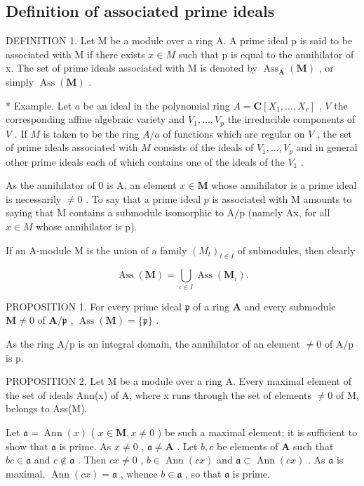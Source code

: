 \subsection{Definition of associated prime ideals}

DEFINITION 1. Let M be a module over a ring A. A prime ideal p is said to be associated with M if there exists \(x \in M\) such that p is equal to the annihilator of x. The set of prime ideals associated with M is denoted by \(\operatorname{Ass}_{\mathbf{A}}(\mathbf{M})\) , or simply \(\operatorname{Ass}(\mathbf{M})\) .

* Example. Let \(a\) be an ideal in the polynomial ring \(A = \mathbf{C}[X_1, \ldots, X_r]\) , \(V\) the corresponding affine algebraic variety and \(V_1, \ldots, V_p\) the irreducible components of \(V\) . If \(M\) is taken to be the ring \(A/a\) of functions which are regular on \(V\) , the set of prime ideals associated with \(M\) consists of the ideals of \(V_1, \ldots, V_p\) and in general other prime ideals each of which contains one of the ideals of the \(V_1\) .

As the annihilator of 0 is A, an element \(x \in \mathbf{M}\) whose annihilator is a prime ideal is necessarily \(\neq 0\) . To say that a prime ideal \(p\) is associated with M amounts to saying that M contains a submodule isomorphic to A/p (namely Ax, for all \(x \in M\) whose annihilator is p).

If an A-module M is the union of a family \((M_{t})_{t\in I}\) of submodules, then clearly

\[
\operatorname{Ass} (\mathbf {M}) = \bigcup_ {\iota \in I} \operatorname{Ass} \left(\mathbf {M} _ {\iota}\right).\tag{1}
\]

PROPOSITION 1. For every prime ideal \(\mathfrak{p}\) of a ring \(\mathbf{A}\) and every submodule \(\mathbf{M} \neq 0\) of \(\mathbf{A} / \mathfrak{p}\) , \(\operatorname{Ass}(\mathbf{M}) = \{\mathfrak{p}\}\) .

As the ring A/p is an integral domain, the annihilator of an element \(\neq0\) of A/p is p.

PROPOSITION 2. Let M be a module over a ring A. Every maximal element of the set of ideals Ann(x) of A, where x runs through the set of elements \(\neq0\) of M, belongs to Ass(M).

Let \(\mathfrak{a} = \operatorname{Ann}(x)\) ( \(x \in \mathbf{M}, x \neq 0\) ) be such a maximal element; it is sufficient to show that \(\mathfrak{a}\) is prime. As \(x \neq 0\) , \(\mathfrak{a} \neq \mathbf{A}\) . Let \(b, c\) be elements of \(\mathbf{A}\) such that \(bc \in \mathfrak{a}\) and \(c \notin \mathfrak{a}\) . Then \(cx \neq 0\) , \(b \in \operatorname{Ann}(cx)\) and \(\mathfrak{a} \subset \operatorname{Ann}(cx)\) . As \(\mathfrak{a}\) is maximal, \(\operatorname{Ann}(cx) = \mathfrak{a}\) , whence \(b \in \mathfrak{a}\) , so that \(\mathfrak{a}\) is prime.

